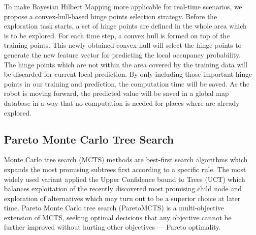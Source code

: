 To make Bayesian Hilbert Mapping more applicable for real-time scenarios, we propose a convex-hull-based hinge points selection strategy. Before the exploration task starts, a set of hinge points are defined in the whole area which is to be explored. For each time step, a convex hull is formed on top of the training points. This newly obtained convex hull will select the hinge points to generate the new feature vector for predicting the local occupancy probability. The hinge points which are not within the area covered by the training data will be discarded for current local prediction. By only including those important hinge points in our training and prediction, the computation time will be saved. As the robot is moving forward, the predicted value will be saved in a global map database in a way that no computation is needed for places where are already explored.

\subsection{Pareto Monte Carlo Tree Search} \label{subsec:2.2}
Monte Carlo tree search (MCTS) methods are best-first search algorithms which expands the most promising subtrees first according to a specific rule.
The most widely used variant applied the Upper Confidence bound to Trees (UCT) which balances exploitation of the recently discovered most promising child node and exploration of alternatives which may turn out to be a superior choice at later time.
Pareto Monte Carlo tree search (ParetoMCTS) is a multi-objective extension of MCTS, seeking optimal decisions that any objective cannot be further improved without hurting other objectives --- Pareto optimality.  

